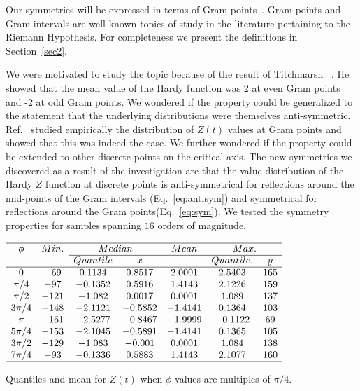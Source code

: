 \documentclass[twoside]{article}
\begin{document}
Our symmetries will be expressed in terms of Gram points~\cite{Gram 1903}. Gram points and  Gram intervals are well known topics of study in the literature pertaining to the Riemann Hypothesis. For completeness we present the definitions in Section~\ref{sec2}.


We were motivated to study the topic because of the result of Titchmarsh~\cite{Titchmarsh 1934} . He showed that the mean value of the Hardy function was 2 at even Gram points and -2 at odd Gram points. We wondered if the property could be generalized to the statement that the underlying distributions were themselves anti-symmetric. Ref.~\cite{Shanker 2018a} studied empirically the distribution of $Z(t)$ values at Gram points and showed  that this was indeed the case. We further wondered if  the property could be extended to other discrete points on the critical axis. The new symmetries we discovered as a result of the investigation  are that the  value
distribution of the Hardy $Z$ function at discrete points is anti-symmetrical for reflections around the mid-points of the Gram intervals (Eq.~\ref{eq:antisym}) and symmetrical for reflections around the Gram points(Eq.~\ref{eq:sym}). We tested the symmetry properties for samples spanning $16$ orders of magnitude.

\begin{table}
\centering \(\begin{array}{ccccccc}
\hline
 \phi &     Min.   &  \multicolumn{2}{c}  {Median }   &   Mean   &  \multicolumn{2}{c}  {Max.} \\
  \cline{3-7}  
 &              & Quantile   &      x      &              & Quantile.    &  y \\
\hline
0 &-69 &0.1134 &0.8517 &2.0001 &2.5403 &165  \\
\pi/4 &-97 &-0.1352 &0.5916 &1.4143 &2.1226 &159 \\
\pi/2 &-121 &-1.082 &0.0017 &0.0001 &1.089 &137 \\
3\pi/4&-148 &-2.1121 &-0.5852 &-1.4141 &0.1364 &103 \\
\pi &-161 &-2.5277 &-0.8467 &-1.9999 &-0.1122 &69 \\
5\pi/4 &-153 &-2.1045 &-0.5891 &-1.4141 &0.1365 &105 \\
3\pi/2 &-129 &-1.083 &-0.001 &0.0001 &1.084 &138 \\
7\pi/4 &-93 &-0.1336 &0.5883 &1.4143 &2.1077 &160 \\
\hline
\end{array}\)
\caption{Quantiles and mean for  $Z(t)$ when $\phi$ values are multiples of $\pi/4$.} 
\label{tab:multicolumn}
\end{table}
\end{document}
